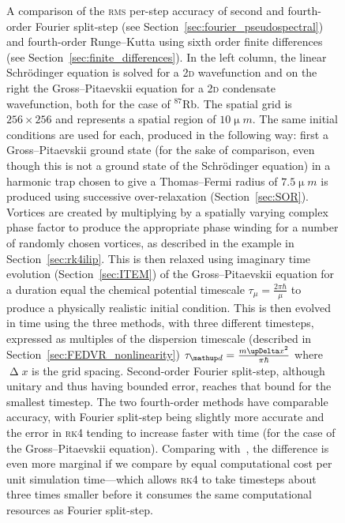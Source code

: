 {\begin{figure}[th]
    \caption{A comparison of the \textsc{rms} per-step accuracy of second and fourth-order Fourier split-step (see Section~\ref{sec:fourier_pseudospectral}) and fourth-order Runge--Kutta using sixth order finite differences (see Section~\ref{sec:finite_differences}). In the left column, the linear Schr\"odinger equation is solved for a \textsc{2d} wavefunction and on the right the Gross--Pitaevskii equation for a \textsc{2d} condensate wavefunction, both for the case of $^{87}$Rb. The spatial grid is $256\times256$ and represents a spatial region of $10\unit{\upmu m}$. The same initial conditions are used for each, produced in the following way: first a Gross--Pitaevskii ground state (for the sake of comparison, even though this is not a ground state of the Schr\"odinger equation) in a harmonic trap chosen to give a Thomas--Fermi radius of $7.5\unit{\upmu m}$ is produced using successive over-relaxation (Section~\ref{sec:SOR}). Vortices are created by multiplying by a spatially varying complex phase factor to produce the appropriate phase winding for a number of randomly chosen vortices, as described in the example in Section~\ref{sec:rk4ilip}. This is then relaxed using imaginary time evolution (Section~\ref{sec:ITEM}) of the Gross--Pitaevskii equation for a duration equal the chemical potential timescale $\tau_{\mu}=\frac{2\pi\hbar}{\mu}$ to produce a physically realistic initial condition. This is then evolved in time using the three methods, with three different timesteps, expressed as multiples of the dispersion timescale (described in Section~\ref{sec:FEDVR_nonlinearity}) $\tau_\up{d}=\frac{m\upDelta x^2}{\pi\hbar}$ where $\upDelta x$ is the grid spacing. Second-order Fourier split-step, although unitary and thus having bounded error, reaches that bound for the smallest timestep. The two fourth-order methods have comparable accuracy, with Fourier split-step being slightly more accurate and the error in \textsc{rk4} tending to increase faster with time (for the case of the Gross--Pitaevskii equation). Comparing with~, the difference is even more marginal if we compare by equal computational cost per unit simulation time---which allows \textsc{rk4} to take timesteps about three times smaller before it consumes the same computational resources as Fourier split-step.}
    \label{fig:stability}
    \end{figure}
    \restoregeometry
}


